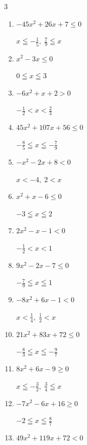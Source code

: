 \begin{multicols}{3}
\begin{enumerate}
  \item $-45x^{2}+26x+7\leq 0$

        $\displaystyle x \leqq -\frac{1}{5} , \; \frac{7}{9} \leqq x$

  \item $x^{2}-3x\leq 0$

        $\displaystyle 0 \leqq x \leqq 3$

  \item $-6x^{2}+x+2>0$

        $\displaystyle -\frac{1}{2} < x < \frac{2}{3}$

  \item $45x^{2}+107x+56\leq 0$

        $\displaystyle -\frac{8}{5} \leqq x \leqq -\frac{7}{9}$

  \item $-x^{2}-2x+8<0$

        $\displaystyle x < -4 , \; 2 < x$

  \item $x^{2}+x-6\leq 0$

        $\displaystyle -3 \leqq x \leqq 2$

  \item $2x^{2}-x-1<0$

        $\displaystyle -\frac{1}{2} < x < 1$

  \item $9x^{2}-2x-7\leq 0$

        $\displaystyle -\frac{7}{9} \leqq x \leqq 1$

\columnbreak %

  \item $-8x^{2}+6x-1<0$

        $\displaystyle x < \frac{1}{4} , \; \frac{1}{2} < x$

  \item $21x^{2}+83x+72\leq 0$

        $\displaystyle -\frac{8}{3} \leqq x \leqq -\frac{9}{7}$

  \item $8x^{2}+6x-9\geq 0$

        $\displaystyle x \leqq -\frac{3}{2} , \; \frac{3}{4} \leqq x$

  \item $-7x^{2}-6x+16\geq 0$

        $\displaystyle -2 \leqq x \leqq \frac{8}{7}$

  \item $49x^{2}+119x+72<0$


\end{enumerate}
\end{multicols}
